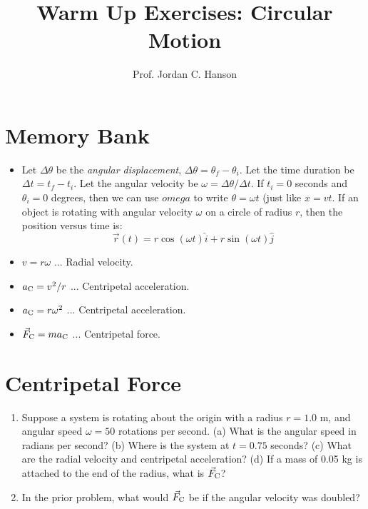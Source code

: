 \documentclass{article}
\begin{document}
\title{Warm Up Exercises: Circular Motion}
\author{Prof. Jordan C. Hanson}

\maketitle

\section{Memory Bank}

\begin{itemize}
\item Let $\Delta\theta$ be the \textit{angular displacement}, $\Delta\theta = \theta_f - \theta_i$.  Let the time duration be $\Delta t = t_f - t_i$.  Let the angular velocity be $\omega = \Delta \theta / \Delta t$.  If $t_i = 0$ seconds and $\theta_i = 0$ degrees, then we can use $omega$ to write $\theta = \omega t$ (just like $x = v t$.  If an object is rotating with angular velocity $\omega$ on a circle of radius $r$, then the position versus time is:
\begin{equation}
\vec{r}(t) = r\cos(\omega t)\hat{i} + r\sin(\omega t)\hat{j} \label{eq:1}
\end{equation}
\item $v = r\omega$ ... Radial velocity.
\item $a_{\rm C} = v^2/r$ ... Centripetal acceleration.
\item $a_{\rm C} = r \omega^2$ ... Centripetal acceleration.
\item $\vec{F}_{\rm C} = m a_{\rm C}$ ... Centripetal force.
\end{itemize}



\section{Centripetal Force}
\begin{enumerate}
\item Suppose a system is rotating about the origin with a radius $r = 1.0$ m, and angular speed $\omega = 50$ rotations per second. (a) What is the angular speed in radians per second?  (b) Where is the system at $t = 0.75$ seconds?  (c) What are the radial velocity and centripetal acceleration? (d) If a mass of 0.05 kg is attached to the end of the radius, what is $\vec{F}_{\rm C}$? \\ \vspace{3cm}
\item In the prior problem, what would $\vec{F}_{\rm C}$ be if the angular velocity was doubled?
\end{enumerate}
\end{document}
